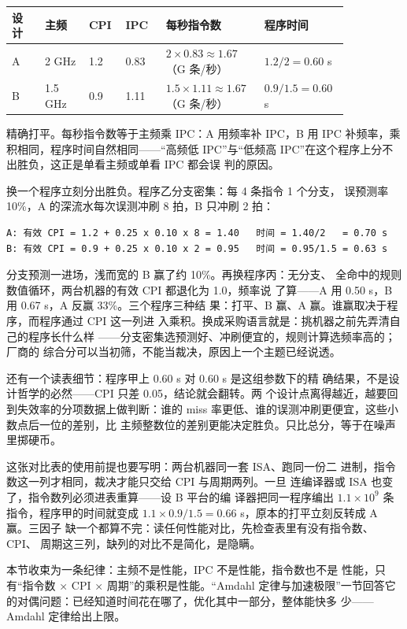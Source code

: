 \begin{longtable}{L{0.09\linewidth}L{0.12\linewidth}L{0.1\linewidth}L{0.11\linewidth}L{0.24\linewidth}L{0.19\linewidth}}
\toprule
设计 & 主频 & CPI & IPC & 每秒指令数 & 程序时间 \\
\midrule
A & 2 GHz & 1.2 & 0.83 & $2\times0.83\approx1.67$（G 条/秒） & $1.2/2=0.60$ s \\\tablerowrule
B & 1.5 GHz & 0.9 & 1.11 & $1.5\times1.11\approx1.67$（G 条/秒） & $0.9/1.5=0.60$ s \\
\bottomrule
\end{longtable}

精确打平。每秒指令数等于主频乘 IPC：A 用频率补 IPC，B 用 IPC
补频率，乘积相同，程序时间自然相同——“高频低 IPC”与“低频高
IPC”在这个程序上分不出胜负，这正是单看主频或单看 IPC 都会误
判的原因。

换一个程序立刻分出胜负。程序乙分支密集：每 4 条指令 1 个分支，
误预测率 10\%，A 的深流水每次误测冲刷 8 拍，B 只冲刷 2 拍：

\begin{lstlisting}
A: 有效 CPI = 1.2 + 0.25 x 0.10 x 8 = 1.40   时间 = 1.40/2   = 0.70 s
B: 有效 CPI = 0.9 + 0.25 x 0.10 x 2 = 0.95   时间 = 0.95/1.5 = 0.63 s
\end{lstlisting}

分支预测一进场，浅而宽的 B 赢了约 10\%。再换程序丙：无分支、
全命中的规则数值循环，两台机器的有效 CPI 都退化为 1.0，频率说
了算——A 用 0.50 s，B 用 0.67 s，A 反赢 33\%。三个程序三种结
果：打平、B 赢、A 赢。谁赢取决于程序，而程序通过 CPI 这一列进
入乘积。换成采购语言就是：挑机器之前先弄清自己的程序长什么样
——分支密集选预测好、冲刷便宜的，规则计算选频率高的；厂商的
综合分可以当初筛，不能当裁决，原因上一个主题已经说透。

还有一个读表细节：程序甲上 0.60 s 对 0.60 s 是这组参数下的精
确结果，不是设计哲学的必然——CPI 只差 0.05，结论就会翻转。两
个设计点离得越近，越要回到失效率的分项数据上做判断：谁的
miss 率更低、谁的误测冲刷更便宜，这些小数点后一位的差别，比
主频整数位的差别更能决定胜负。只比总分，等于在噪声里掷硬币。

这张对比表的使用前提也要写明：两台机器同一套 ISA、跑同一份二
进制，指令数这一列才相同，裁决才能只交给 CPI 与周期两列。一旦
连编译器或 ISA 也变了，指令数列必须进表重算——设 B 平台的编
译器把同一程序编出 $1.1\times10^9$ 条指令，程序甲的时间就变成
$1.1\times0.9/1.5=0.66$ s，原本的打平立刻反转成 A 赢。三因子
缺一个都算不完：读任何性能对比，先检查表里有没有指令数、CPI、
周期这三列，缺列的对比不是简化，是隐瞒。

本节收束为一条纪律：主频不是性能，IPC 不是性能，指令数也不是
性能，只有“指令数 × CPI × 周期”的乘积是性能。“Amdahl 定律与加速极限”一节回答它
的对偶问题：已经知道时间花在哪了，优化其中一部分，整体能快多
少——Amdahl 定律给出上限。

